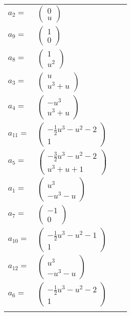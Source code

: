 \documentclass[1p]{elsarticle_modified}
\theoremstyle{definition}
\begin{document}
\begin{tabular}{m{7pt} m{180pt} m{7pt} m{180pt} }
\flushright $a_{2}=$&$\begin{pmatrix}0\\u\end{pmatrix}$ \\
\flushright $a_{9}=$&$\begin{pmatrix}1\\0\end{pmatrix}$ \\
\flushright $a_{8}=$&$\begin{pmatrix}1\\u^2\end{pmatrix}$ \\
\flushright $a_{3}=$&$\begin{pmatrix}u\\u^3+u\end{pmatrix}$ \\
\flushright $a_{4}=$&$\begin{pmatrix}- u^3\\u^3+u\end{pmatrix}$ \\
\flushright $a_{11}=$&$\begin{pmatrix}-\frac{1}{2} u^3- u^2-2\\1\end{pmatrix}$ \\
\flushright $a_{5}=$&$\begin{pmatrix}-\frac{3}{2} u^3- u^2-2\\u^3+u+1\end{pmatrix}$ \\
\flushright $a_{1}=$&$\begin{pmatrix}u^3\\- u^3- u\end{pmatrix}$ \\
\flushright $a_{7}=$&$\begin{pmatrix}-1\\0\end{pmatrix}$ \\
\flushright $a_{10}=$&$\begin{pmatrix}-\frac{1}{2} u^3- u^2-1\\1\end{pmatrix}$ \\
\flushright $a_{12}=$&$\begin{pmatrix}u^3\\- u^3- u\end{pmatrix}$ \\
\flushright $a_{6}=$&$\begin{pmatrix}-\frac{1}{2} u^3- u^2-2\\1\end{pmatrix}$\\&\end{tabular}
\end{document}
